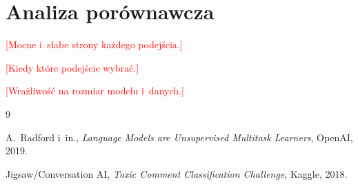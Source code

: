 \documentclass[10pt,a4paper]{article}
\newcommand{\todo}[1]{\textcolor{red}{[#1]}}
\begin{document}
\section{Analiza porównawcza}

\todo{Mocne i~słabe strony każdego podejścia.}

\todo{Kiedy które podejście wybrać.}

\todo{Wrażliwość na rozmiar modelu i~danych.}

\begin{thebibliography}{9}\small
\item A.~Radford i~in., \emph{Language Models are Unsupervised Multitask Learners}, OpenAI, 2019.
\item Jigsaw/Conversation AI, \emph{Toxic Comment Classification Challenge}, Kaggle, 2018.
\end{thebibliography}
\end{document}
